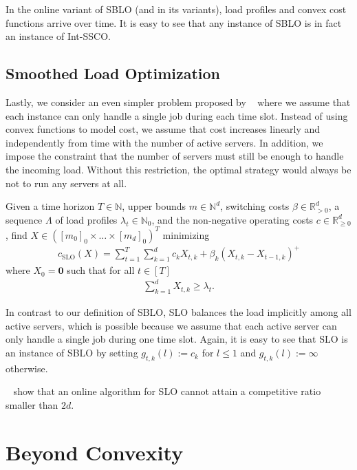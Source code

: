 In the online variant of SBLO (and in its variants), load profiles and convex cost functions arrive over time. It is easy to see that any instance of SBLO is in fact an instance of Int-SSCO.

\subsection{Smoothed Load Optimization}

Lastly, we consider an even simpler problem proposed by \citeauthor*{Albers2021}~\cite{Albers2021} where we assume that each instance can only handle a single job during each time slot. Instead of using convex functions to model cost, we assume that cost increases linearly and independently from time with the number of active servers. In addition, we impose the constraint that the number of servers must still be enough to handle the incoming load. Without this restriction, the optimal strategy would always be not to run any servers at all.

\begin{problem}\label{problem:slo}
Given a time horizon $T \in \mathbb{N}$, upper bounds $m \in \mathbb{N}^d$, switching costs $\beta \in \mathbb{R}_{>0}^d$, a sequence $\Lambda$ of load profiles $\lambda_t \in \mathbb{N}_0$, and the non-negative operating costs $c \in \mathbb{R}_{\geq 0}^d$, find $X \in ([m_0]_0 \times \dots \times [m_d]_0)^T$ minimizing \begin{align*}
    c_{\text{SLO}}(X) = \sum_{t=1}^T \sum_{k=1}^d c_k X_{t,k} + \beta_k (X_{t,k} - X_{t-1,k})^+
\end{align*}
where $X_0 = \mathbf{0}$ such that for all $t \in [T]$ \begin{align*}
    \sum_{k=1}^d X_{t,k} \geq \lambda_t.
\end{align*}
\end{problem}

In contrast to our definition of SBLO, SLO balances the load implicitly among all active servers, which is possible because we assume that each active server can only handle a single job during one time slot. Again, it is easy to see that SLO is an instance of SBLO by setting $g_{t,k}(l) := c_k$ for $l \leq 1$ and $g_{t,k}(l) := \infty$ otherwise.

\citeauthor*{Albers2021}~\cite{Albers2021} show that an online algorithm for SLO cannot attain a competitive ratio smaller than $2d$.

\section{Beyond Convexity}\label{section:theory:beyond_convexity}


